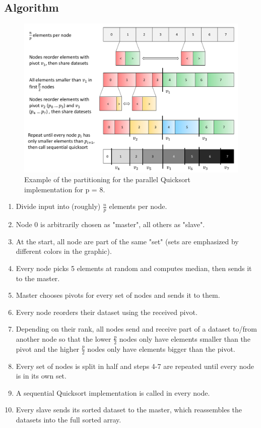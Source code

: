 \documentclass[11pt,a4paper]{article}
\begin{document}
\subsection{Algorithm}
\begin{figure}[h]
	\includegraphics[width=\textwidth]{img/mpi_algorithm.pdf}
	\caption{Example of the partitioning for the parallel Quicksort implementation for p = 8.}
\end{figure}
\begin{enumerate}
	\item Divide input into (roughly) $\frac{n}{p}$ elements per node.
	\item Node 0 is arbitrarily chosen as "master", all others as "slave".
	\item At the start, all node are part of the same "set" (sets are emphasized by different colors in the graphic).
	\item Every node picks 5 elements at random and computes median, then sends it to the master.
	\item Master chooses pivots for every set of nodes and sends it to them.
	\item Every node reorders their dataset using the received pivot.
	\item Depending on their rank, all nodes send and receive part of a dataset to/from another node so that the lower $\frac{p}{2}$ nodes only have elements smaller than the pivot and the higher $\frac{p}{2}$ nodes only have elements bigger than the pivot.
	\item Every set of nodes is split in half and steps 4-7 are repeated until every node is in its own set.
	\item A sequential Quicksort implementation is called in every node.
	\item Every slave sends its sorted dataset to the master, which reassembles the datasets into the full sorted array.
	
\end{enumerate}
\end{document}
